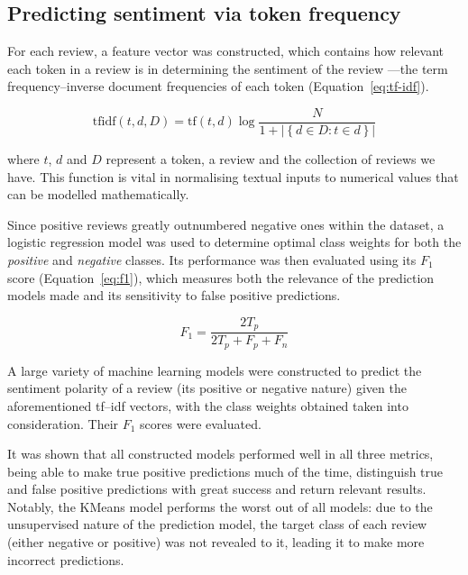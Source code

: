 \documentclass[11pt, a4paper]{pancake-article}
\begin{document}
\subsection{Predicting sentiment via token frequency}

For each review, a feature vector was constructed, which contains how
relevant each token in a review is in determining the sentiment of the review
---the term frequency--inverse document frequencies of each token
(Equation~\ref{eq:tf-idf}).

\begin{equation}
  \text{tfidf}\left(t, d, D\right) = \text{tf}\left(t,
  d\right)\log\frac{N}{1 + \left|\left\{d \in D : t\in d\right\}\right|}
  \label{eq:tf-idf}
\end{equation}

where \(t\), \(d\) and \(D\) represent a token, a review and the
collection of reviews we have. This function is vital
in normalising textual inputs to numerical values that can be
modelled mathematically.

Since positive reviews greatly outnumbered negative ones within the
dataset, a logistic regression model was used to
determine optimal class weights for both the \textit{positive} and
\textit{negative} classes. Its performance was then evaluated using
its $F_1$ score (Equation~\ref{eq:f1}), which measures both the
relevance of the prediction models made and its sensitivity to false
positive predictions.

\begin{equation}
  F_1 = \frac{2 T_p}{2 T_p + F_p + F_n}
  \label{eq:f1}
\end{equation}

A large variety of machine learning models were constructed
to predict the sentiment polarity of a review (its positive or
negative nature) given the aforementioned tf--idf vectors, with
the class weights obtained taken into consideration. Their $F_1$
scores were evaluated.

It was shown that all constructed models performed well in all three
metrics, being
able to make true positive predictions much of the time, distinguish
true and false
positive predictions with great success and return relevant results.
Notably, the KMeans
model performs the worst out of all models: due to the unsupervised
nature of the prediction
model, the target class of each review (either negative or positive)
was not revealed to it,
leading it to make more incorrect predictions.
\end{document}
